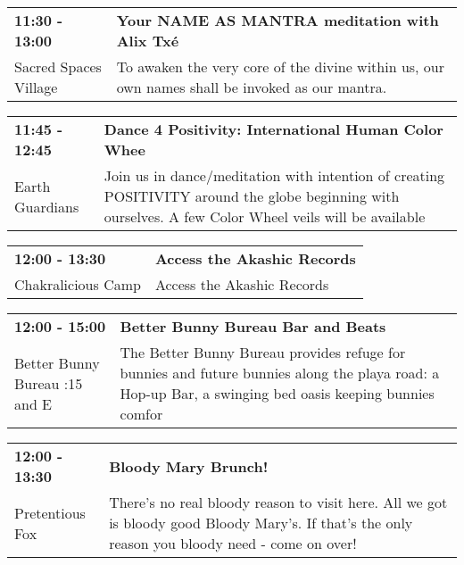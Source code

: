\begin{tabular}{ p{1in} p{2.2in} }
    \textbf{11:30 - 13:00} & \textbf{Your NAME AS MANTRA meditation with Alix Tx\'e} \\
    Sacred Spaces Village \newline  & To awaken the very core of the divine within us, our own names shall be invoked as our mantra. \\
    \hline 
\end{tabular}
    
\begin{tabular}{ p{1in} p{2.2in} }
    \textbf{11:45 - 12:45} & \textbf{Dance 4 Positivity: International Human Color Whee} \\
    Earth Guardians \newline  & Join us in dance/meditation with intention of creating POSITIVITY around the globe beginning with ourselves. A few Color Wheel veils will be available \\
    \hline 
\end{tabular}
    
\begin{tabular}{ p{1in} p{2.2in} }
    \textbf{12:00 - 13:30} & \textbf{Access the Akashic Records} \\
    Chakralicious Camp \newline  & Access the Akashic Records \\
    \hline 
\end{tabular}
    
\begin{tabular}{ p{1in} p{2.2in} }
    \textbf{12:00 - 15:00} & \textbf{Better Bunny Bureau Bar and Beats} \\
    Better Bunny Bureau \newline 4:15 and E & The Better Bunny Bureau provides refuge for bunnies and future bunnies along the playa road: a Hop-up Bar, a swinging bed oasis keeping bunnies comfor \\
    \hline 
\end{tabular}
    
\begin{tabular}{ p{1in} p{2.2in} }
    \textbf{12:00 - 13:30} & \textbf{Bloody Mary Brunch!} \\
    Pretentious Fox \newline  & There's no real bloody reason to visit here. All we got is bloody good Bloody Mary's. If that's the only reason you bloody need - come on over! \\
    \hline 
\end{tabular}
    
